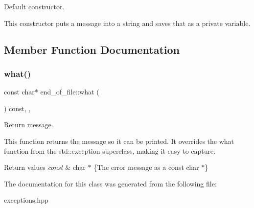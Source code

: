 Default constructor. 

This constructor puts a message into a string and saves that as a private variable. 

\subsection{Member Function Documentation}
\mbox{\label{classend__of__file_a32e8c4c2f39a8484c2f39f9a98d5dfb8}} 
\subsubsection{\texorpdfstring{what()}{what()}}
{\footnotesize\ttfamily const char$\ast$ end\+\_\+of\+\_\+file\+::what (\begin{DoxyParamCaption}{ }\end{DoxyParamCaption}) const\hspace{0.3cm}{\ttfamily [inline]}, {\ttfamily [override]}, {\ttfamily [noexcept]}}



Return message. 

This function returns the message so it can be printed. It overrides the what function from the std\+::exception superclass, making it easy to capture.


\begin{DoxyRetVals}{Return values}
{\em const} & char $\ast$ \{The error message as a const char $\ast$\} \\
\hline
\end{DoxyRetVals}


The documentation for this class was generated from the following file\+:\begin{DoxyCompactItemize}
\item 
exceptions.\+hpp\end{DoxyCompactItemize}
